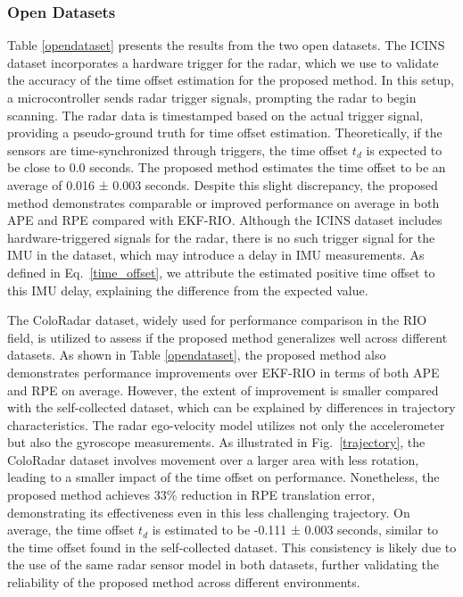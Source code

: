 \subsubsection{Open Datasets}
Table \ref{opendataset} presents the results from the two open datasets. The ICINS dataset incorporates a hardware trigger for the radar, which we use to validate the accuracy of the time offset estimation for the proposed method. In this setup, a microcontroller sends radar trigger signals, prompting the radar to begin scanning. The radar data is timestamped based on the actual trigger signal, providing a pseudo-ground truth for time offset estimation. Theoretically, if the sensors are time-synchronized through triggers, the time offset \( t_d \) is expected to be close to 0.0 seconds. The proposed method estimates the time offset to be an average of 0.016 ± 0.003 seconds. Despite this slight discrepancy, the proposed method demonstrates comparable or improved performance on average in both APE and RPE compared with EKF-RIO. Although the ICINS dataset includes hardware-triggered signals for the radar, there is no such trigger signal for the IMU in the dataset, which may introduce a delay in IMU measurements. As defined in Eq.~\eqref{time_offset}, we attribute the estimated positive time offset to this IMU delay, explaining the difference from the expected value.

The ColoRadar dataset, widely used for performance comparison in the RIO field, is utilized to assess if the proposed method generalizes well across different datasets. As shown in Table \ref{opendataset}, the proposed method also demonstrates performance improvements over EKF-RIO in terms of both APE and RPE on average. However, the extent of improvement is smaller compared with the self-collected dataset, which can be explained by differences in trajectory characteristics. The radar ego-velocity model utilizes not only the accelerometer but also the gyroscope measurements. As illustrated in Fig.~\ref{trajectory}, the ColoRadar dataset involves movement over a larger area with less rotation, leading to a smaller impact of the time offset on performance. Nonetheless, the proposed method achieves 33\% reduction in RPE translation error, demonstrating its effectiveness even in this less challenging trajectory. On average, the time offset \( t_d \) is estimated to be -0.111 ± 0.003 seconds, similar to the time offset found in the self-collected dataset. This consistency is likely due to the use of the same radar sensor model in both datasets, further validating the reliability of the proposed method across different environments.

